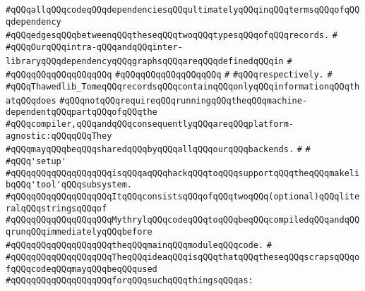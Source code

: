 \verb|#qQQqallqQQqcodeqQQqdependenciesqQQqultimatelyqQQqinqQQqtermsqQQqofqQQqdependency|\newline
\verb|#qQQqedgesqQQqbetweenqQQqtheseqQQqtwoqQQqtypesqQQqofqQQqrecords.|\newline
\verb|#|\newline
\verb|#qQQqOurqQQqintra-qQQqandqQQqinter-libraryqQQqdependencyqQQqgraphsqQQqareqQQqdefinedqQQqin|\newline
\verb|#|\newline
\verb|#qQQqqQQqqQQqqQQqqQQq|\newline
\verb|#qQQqqQQqqQQqqQQqqQQq|\newline
\verb|#|\newline
\verb|#qQQqrespectively.|\newline
\verb|#|\newline
\verb|#qQQqThawedlib_TomeqQQqrecordsqQQqcontainqQQqonlyqQQqinformationqQQqthatqQQqdoes|\newline
\verb|#qQQqnotqQQqrequireqQQqrunningqQQqtheqQQqmachine-dependentqQQqpartqQQqofqQQqthe|\newline
\verb|#qQQqcompiler,qQQqandqQQqconsequentlyqQQqareqQQqplatform-agnostic:qQQqqQQqThey|\newline
\verb|#qQQqmayqQQqbeqQQqsharedqQQqbyqQQqallqQQqourqQQqbackends.|\newline
\verb|#|\newline
\verb|#|\newline
\verb|#qQQq'setup'|\newline
\verb|#qQQqqQQqqQQqqQQqqQQqisqQQqaqQQqhackqQQqtoqQQqsupportqQQqtheqQQqmakelibqQQq'tool'qQQqsubsystem.|\newline
\verb|#qQQqqQQqqQQqqQQqqQQqItqQQqconsistsqQQqofqQQqtwoqQQq(optional)qQQqliteralqQQqstringsqQQqof|\newline
\verb|#qQQqqQQqqQQqqQQqqQQqMythrylqQQqcodeqQQqtoqQQqbeqQQqcompiledqQQqandqQQqrunqQQqimmediatelyqQQqbefore|\newline
\verb|#qQQqqQQqqQQqqQQqqQQqtheqQQqmainqQQqmoduleqQQqcode.|\newline
\verb|#|\newline
\verb|#qQQqqQQqqQQqqQQqqQQqTheqQQqideaqQQqisqQQqthatqQQqtheseqQQqscrapsqQQqofqQQqcodeqQQqmayqQQqbeqQQqused|\newline
\verb|#qQQqqQQqqQQqqQQqqQQqforqQQqsuchqQQqthingsqQQqas:|\newline
